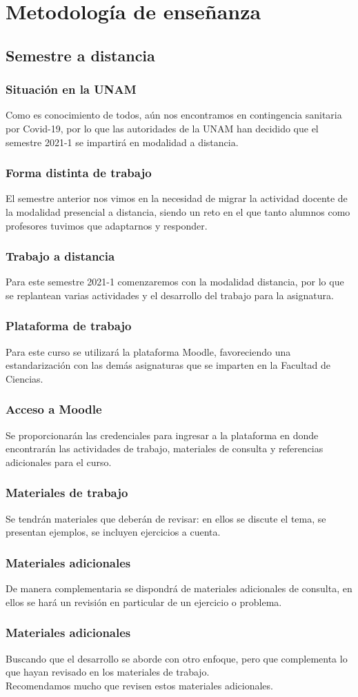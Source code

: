 \section{Metodología de enseñanza}
\subsection{Semestre a distancia}
\begin{frame}
\frametitle{Situación en la UNAM}
Como es conocimiento de todos, aún nos encontramos en contingencia sanitaria por Covid-19, por lo que las autoridades de la UNAM han decidido que el semestre 2021-1 se impartirá en modalidad a distancia.
\end{frame}
\begin{frame}
\frametitle{Forma distinta de trabajo}
El semestre anterior nos vimos en la necesidad de migrar la actividad docente de la modalidad presencial a distancia, siendo un reto en el que tanto alumnos como profesores tuvimos que adaptarnos y responder.
\end{frame}
\begin{frame}
\frametitle{Trabajo a distancia}
Para este semestre 2021-1 comenzaremos con la modalidad distancia, por lo que se replantean varias actividades y el desarrollo del trabajo para la asignatura.
\end{frame}
\begin{frame}
\frametitle{Plataforma de trabajo}
Para este curso se utilizará la plataforma Moodle, favoreciendo una estandarización con las demás asignaturas que se imparten en la Facultad de Ciencias.
\end{frame}
\begin{frame}
\frametitle{Acceso a Moodle}
Se proporcionarán las credenciales para ingresar a la plataforma en donde encontrarán las actividades de trabajo, materiales de consulta y referencias adicionales para el curso.
\end{frame}
\begin{frame}
\frametitle{Materiales de trabajo}
Se tendrán materiales que deberán de revisar: en ellos se discute el tema, se presentan ejemplos, se incluyen ejercicios a cuenta.
\end{frame}
\begin{frame}
\frametitle{Materiales adicionales}
De manera complementaria se dispondrá de materiales adicionales de consulta, en ellos se hará un revisión en particular de un ejercicio o problema.
\end{frame}
\begin{frame}
\frametitle{Materiales adicionales}
Buscando que el desarrollo se aborde con otro enfoque, pero que complementa lo que hayan revisado en los materiales de trabajo.
\\
\bigskip
Recomendamos mucho que revisen estos materiales adicionales.
\end{frame}
